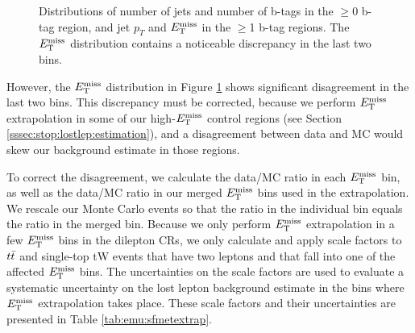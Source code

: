 \begin{figure}[htbp]
\caption{Distributions of number of jets and number of b-tags in the
  $\geq$0 b-tag region, and jet $p_T$ and $E_\text{T}^\text{miss}$ in the $\geq$1 b-tag
  regions. The $E_\text{T}^\text{miss}$ distribution contains a noticeable discrepancy in
  the last two bins.}
\label{fig:emu:kinematics}
\end{figure}

However, the $E_\text{T}^\text{miss}$ distribution in Figure \ref{fig:emu:kinematics}
shows significant disagreement in the last two bins. This discrepancy
must be corrected, because we perform $E_\text{T}^\text{miss}$ extrapolation in some of
our high-$E_\text{T}^\text{miss}$ control regions (see Section
\ref{sssec:stop:lostlep:estimation}), and a disagreement between data
and MC would skew our background estimate in those regions.

To correct the disagreement, we calculate the data/MC ratio in each
$E_\text{T}^\text{miss}$ bin, as well as the data/MC ratio in our merged $E_\text{T}^\text{miss}$ bins
used in the extrapolation. We rescale our Monte Carlo
events so that the ratio in the individual bin equals the ratio in the
merged bin. Because we only perform $E_\text{T}^\text{miss}$ extrapolation in a few
$E_\text{T}^\text{miss}$ bins in the dilepton CRs, we only calculate and apply scale
factors to $t\bar{t}$ and single-top tW events that have two leptons and
that fall into one of the affected $E_\text{T}^\text{miss}$ bins. The uncertainties on the
scale factors are used to evaluate a systematic uncertainty on the
lost lepton background estimate in the bins where $E_\text{T}^\text{miss}$ extrapolation
takes place. These scale factors and their uncertainties are presented
in Table \ref{tab:emu:sfmetextrap}.

